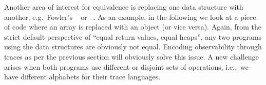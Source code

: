 Another area of interest for equivalence is replacing one data structure with another,
e.g.\ Fowler's ~\cite[p.186]{fowler:refactoring} or ~\cite{fowler:refactoring2nd}.
As an example, in the following we look at a piece of code where an array is replaced with an object (or vice versa).
Again, from the strict default perspective of ``equal return values, equal heaps'', any two programs using the data structures are obviously not equal.
Encoding observability through traces as per the previous section will obviously solve this issue.
A new challenge arises when both programs use different or disjoint sets of operations, i.e.,\ we have different alphabets for their trace languages.




